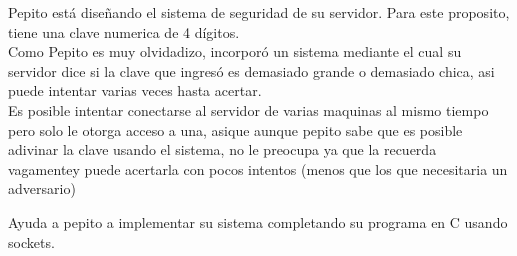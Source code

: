\documentclass{article}
\begin{document}
Pepito está diseñando el sistema de seguridad de su servidor. Para este
proposito, tiene una clave numerica de 4 dígitos.\\

Como Pepito es muy olvidadizo, incorporó un sistema mediante el cual su
servidor dice si la clave que ingresó es demasiado grande o demasiado chica,
asi puede intentar varias veces hasta acertar.\\

Es posible intentar conectarse al servidor de varias maquinas al mismo tiempo
pero solo le otorga acceso a una, asique aunque pepito sabe que es posible
adivinar la clave usando el sistema, no le preocupa ya que la recuerda 
vagamentey puede acertarla con pocos intentos (menos que los que necesitaria
un adversario)

Ayuda a pepito a implementar su sistema completando su programa en C usando sockets.
\end{document}
